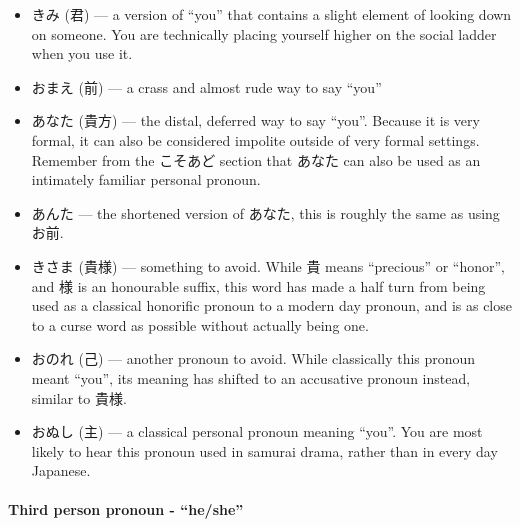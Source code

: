 \documentclass[11pt, b5paper, twoside, openright, onecolumn]{book}
\makeatletter
\newcommand*{\rubystack}[2]{{\relscale{0.5}%
  \begin{tabular}[b]{@{}c@{}}%
    {#1}\\%
   {\textscale{2}{#2}}%
  \end{tabular}}%
}
\DeclareRobustCommand*{\ruby}[2]{%
  \mbox{%
    \setlength{\parskip}{0ex}%
    \BeginAccSupp{method=pdfstringdef,ActualText={#1}}%
      \rubystack{\phantom{#2}}{#1}%
      \llap{%
        \rubystack{#2}{\phantom{#1}}%
      }%
    \EndAccSupp{}%
  }%
}
\renewcommand*{\ruby}[2]{#2 (#1)}%
\makeatother
\begin{document}
\begin{itemize}
\item {}\ruby{君}{きみ} — a version of “you” that contains a slight element of looking down on someone. You are technically placing yourself higher on the social ladder when you use it.
\item {}お\ruby{前}{まえ} — a crass and almost rude way to say “you”
\item {}\ruby{貴方}{あなた} — the distal‚ deferred way to say “you”. Because it is very formal‚ it can also be considered impolite outside of very formal settings. Remember from the こそあど section that あなた can also be used as an intimately familiar personal pronoun.
\item {}あんた — the shortened version of あなた‚ this is roughly the same as using お前.
\item {}\ruby{貴様}{きさま} — something to avoid. While 貴 means “precious” or “honor”‚ and 様 is an honourable suffix‚ this word has made a half turn from being used as a classical honorific pronoun to a modern day  pronoun‚ and is as close to a curse word as possible without actually being one.
\item {}\ruby{己}{おのれ} — another pronoun to avoid. While classically this pronoun meant “you”‚ its meaning has shifted to an accusative pronoun instead‚ similar to 貴様.
\item {}お\ruby{主}{ぬし} — a classical personal pronoun meaning “you”. You are most likely to hear this pronoun used in samurai drama‚ rather than in every day Japanese.
\end{itemize}

\paragraph{Third person pronoun - “he/she”}
\end{document}
